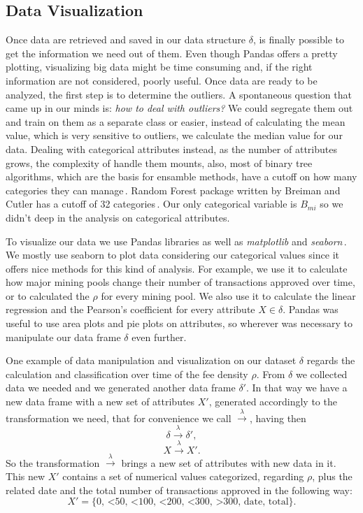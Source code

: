 \documentclass[USenglish]{uit-thesis}
\begin{document}
\subsection{Data Visualization}
\label{sec:datavisualization}
Once data are retrieved and saved in our data structure $\delta$,
is finally possible to get the information we need out of them.
Even though Pandas offers a pretty plotting, 
visualizing big data might be time consuming
and, if the right information are not considered, poorly useful.
Once data are ready to be analyzed, the first
step is to determine the outliers.
A spontaneous question that came up in our minds is:
\emph{how to deal with outliers?} We could segregate them
out and train on them as a separate class or easier, instead of
calculating the mean value, which is very sensitive to outliers,
we calculate the median value for our data.
Dealing with categorical attributes instead, as the number
of attributes grows,
the complexity of handle them mounts,
also, most of binary tree algorithms, which are the basis for
ensamble methods, have a cutoff on how many
categories they can manage\,\cite{bowles2015machine}.
Random Forest package written by Breiman and Cutler
has a cutoff of 32 categories\,\cite{Breiman:2001:RF}.
Our only categorical variable is $B_{mi}$ so we
didn't deep in the analysis on categorical attributes.

To visualize our data we use Pandas libraries
as well as \emph{matplotlib} and
\emph{seaborn}\,\cite{pandas, matplotlib, michael_waskom_seaborn}.
We mostly use seaborn to plot data considering our
categorical values since it offers nice methods for
this kind of analysis. For example, we use it to
calculate how major mining pools change their
number of transactions approved over time, or to
calculated the $\rho$ for every mining pool. We also
use it to calculate the linear regression and the Pearson's
coefficient for every attribute $X \in \delta$.
Pandas was useful to use area plots and pie plots
on attributes, so wherever was necessary to manipulate
our data frame $\delta$ even further.

One example of data manipulation and visualization on our
dataset $\delta$ regards the calculation and classification
over time of the fee density $\rho$. From $\delta$ we collected
data we needed and we generated another data frame $\delta'$.
In that way we have a new data frame with a new set of attributes
$X'$, generated accordingly to the transformation
we need, that for convenience
we call $\xrightarrow{\text{$\lambda$}}$, having then
\[
\delta \xrightarrow{\text{$\lambda$}} \delta',
\]
\[
X \xrightarrow{\text{$\lambda$}} X'.
\]
So the transformation $\xrightarrow{\text{$\lambda$}}$ brings a new set
of attributes with new data in it.
This new $X'$ contains a set of numerical values categorized, 
regarding $\rho$,
plus the related date and the total number of transactions approved in
the following way:
\[
X' = \{\text{0, <50, <100, <200, <300, >300, date, total} \}.
\]
\end{document}
